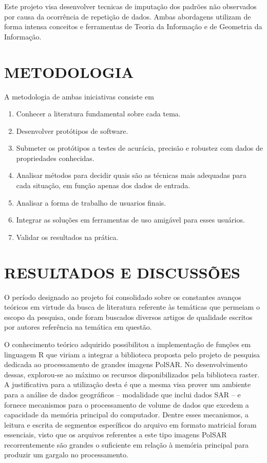 \documentclass[12pt,letterpaper]{article}
\begin{document}
Este projeto visa desenvolver tecnicas de imputação dos padrões não observados por causa da ocorrência de repetição de dados. Ambas abordagens utilizam de forma intensa conceitos e ferramentas de Teoria da Informação e de Geometria da Informação.

  
\newpage
\section*{\centering \textbf{METODOLOGIA}} %
A metodologia de ambas iniciativas consiste em
\begin{enumerate}
\item Conhecer a literatura fundamental sobre cada tema.
\item Desenvolver protótipos de software.
\item Submeter os protótipos a testes de acurácia, precisão e robustez com dados de propriedades conhecidas.
\item Analisar métodos para decidir quais são as técnicas mais adequadas para cada situação, em função apenas dos dados de entrada.
\item Analisar a forma de trabalho de usuarios finais.
\item Integrar as soluções em ferramentas de uso amigável para esses usuários.
\item Validar os resultados na prática.
\end{enumerate}

  
\newpage
\section*{\centering \textbf{RESULTADOS E DISCUSSÕES}} %
O período designado ao projeto foi consolidado sobre os constantes avanços teóricos em virtude da busca de literatura referente às temáticas que permeiam o escopo da pesquisa, onde foram buscados diversos artigos de qualidade escritos por autores referência na temática em questão.

O conhecimento teórico adquirido possibilitou a implementação de funções em linguagem R que viriam a integrar a biblioteca proposta pelo projeto de pesquisa dedicada ao processamento de grandes imagens PolSAR. No desenvolvimento dessas, explorou-se ao máximo os recursos disponibilizados pela biblioteca raster. A justificativa para a utilização desta é que a mesma visa prover um ambiente para a análise de dados geográficos -- modalidade que inclui dados SAR -- e fornece mecanismos para o processamento de volume de dados que excedem a capacidade da memória principal do computador. Dentre esses mecanismos, a leitura e escrita de segmentos específicos do arquivo em formato matricial foram essenciais, visto que os arquivos referentes a este tipo imagens PolSAR recorrentemente são grandes o suficiente em relação à memória principal para produzir um gargalo no processamento.
\end{document}
